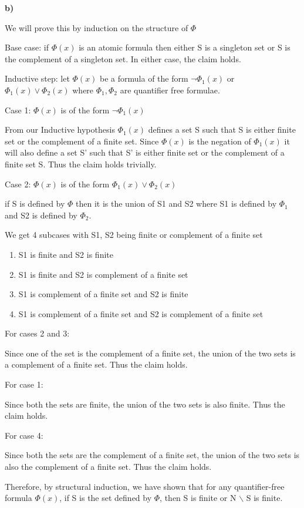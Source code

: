 \documentclass{article}
\begin{document}
\noindent \textbf{b)}

We will prove this by induction on the structure of $\Phi$

Base case: if $\Phi (x)$ is an atomic formula then either S is a singleton set or S is the complement of a singleton set. In either case, the claim holds.

Inductive step: let $\Phi (x)$ be a formula of the form $\neg \Phi_1(x)$ or $\Phi_1(x) \lor \Phi_2(x)$ where $\Phi_1, \Phi_2$ are quantifier free formulae.

Case 1: $\Phi (x)$ is of the form $\neg \Phi_1(x)$

From our Inductive hypothesis $\Phi_1(x)$ defines a set S such that S is either finite set or the complement of a finite set. Since $\Phi(x)$ is the negation of $\Phi_1(x)$ it will also define a set S' such that S' is either finite set or the complement of a finite set S. Thus the claim holds trivially.

Case 2: $\Phi (x)$ is of the form $\Phi_1(x) \lor \Phi_2(x)$

if S is defined by $\Phi$ then it is the union of S1 and S2 where S1 is defined by $\Phi_1$ and S2 is defined by $\Phi_2$.

We get 4 subcases with S1, S2 being finite or complement of a finite set

\begin{enumerate}
    \item S1 is finite and S2 is finite
    \item S1 is finite and S2 is complement of a finite set
    \item S1 is complement of a finite set and S2 is finite
    \item S1 is complement of a finite set and S2 is complement of a finite set
\end{enumerate}

For cases 2 and 3:

Since one of the set is the complement of a finite set, the union of the two sets is a complement of a finite set. Thus the claim holds.

For case 1:

Since both the sets are finite, the union of the two sets is also finite. Thus the claim holds.

For case 4:

Since both the sets are the complement of a finite set, the union of the two sets is also the complement of a finite set. Thus the claim holds.

Therefore, by structural induction, we have shown that for any quantifier-free formula $\Phi (x)$, if S is the set defined by $\Phi$, then S is finite or N $\backslash$ S is finite.
\end{document}
